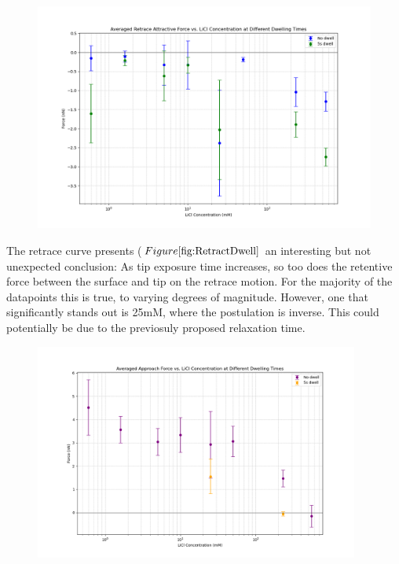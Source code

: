 \begin{figure}[h!]
\centering
\includegraphics[width=\textwidth]{chapter7/Dwell/Retrace overall.png}
\caption{}
\label{fig:RetractDwell}
\end{figure}

The retrace curve presents ($Figure \ref{fig:RetractDwell}$ an interesting but not unexpected conclusion: As tip exposure time increases, so too does the retentive force between the surface and tip on the retrace motion. For the majority of the datapoints this is true, to varying degrees of magnitude. However, one that significantly stands out is 25mM, where the postulation is inverse. This could potentially be due to the previosuly proposed relaxation time.

\begin{figure}[h!]
\centering
\includegraphics[width=0.95\textwidth]{chapter7/Dwell/Approach overall.png}
\caption{}
\label{fig:ApproachDwell}
\end{figure}

